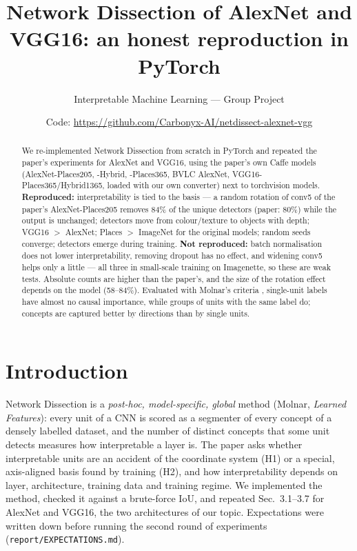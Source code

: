 \documentclass[10pt,a4paper]{article}
\title{\vspace{-1.3cm}\textbf{Network Dissection of AlexNet and VGG16: an honest reproduction in PyTorch}}
\author{Interpretable Machine Learning --- Group Project \\ \fillin{Group members (names, roll numbers)}}
\date{\fillin{Submission date} \quad Code: \url{https://github.com/Carbonyx-AI/netdissect-alexnet-vgg}}
\begin{document}
\maketitle
\vspace{-0.7cm}
\begin{abstract}\noindent
We re-implemented Network Dissection \cite{bau2017} from scratch in PyTorch and repeated the paper's experiments for
AlexNet and VGG16, using the paper's own Caffe models (AlexNet-Places205, -Hybrid, -Places365, BVLC AlexNet,
VGG16-Places365/Hybrid1365, loaded with our own converter) next to torchvision models. \textbf{Reproduced:}
interpretability is tied to the basis --- a random rotation of conv5 of the paper's AlexNet-Places205 removes 84\% of
the unique detectors (paper: 80\%) while the output is unchanged; detectors move from colour/texture to objects with
depth; VGG16 $>$ AlexNet; Places $>$ ImageNet for the original models; random seeds converge; detectors emerge during
training. \textbf{Not reproduced:} batch normalisation does not lower interpretability, removing dropout has no effect,
and widening conv5 helps only a little --- all three in small-scale training on Imagenette, so these are weak tests.
Absolute counts are higher than the paper's, and the size of the rotation effect depends on the model (58--84\%).
Evaluated with Molnar's criteria \cite{molnar}, single-unit labels have almost no causal importance, while groups of units
with the same label do; concepts are captured better by directions than by single units.
\end{abstract}

\section{Introduction}
Network Dissection is a \emph{post-hoc, model-specific, global} method (Molnar, \emph{Learned Features}): every unit of a
CNN is scored as a segmenter of every concept of a densely labelled dataset, and the number of distinct concepts that some
unit detects measures how interpretable a layer is. The paper asks whether interpretable units are an accident of the
coordinate system (H1) or a special, axis-aligned basis found by training (H2), and how interpretability depends on
layer, architecture, training data and training regime. We implemented the method, checked it against a brute-force IoU,
and repeated Sec.~3.1--3.7 for AlexNet and VGG16, the two architectures of our topic. Expectations were written down
before running the second round of experiments (\texttt{report/EXPECTATIONS.md}).
\end{document}
